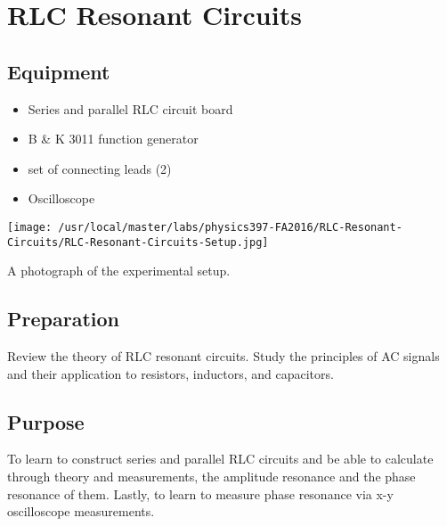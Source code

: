 

%
%


\setcounter{chapter}{5}
\setcounter{equation}{0}
\setcounter{table}{0}
\setcounter{figure}{0}
\chapter{RLC Resonant Circuits}

\section{Equipment}

\begin{minipage}[t]{0.6\textwidth}
\begin{itemize}[noitemsep]
\item Series and parallel RLC circuit board
\item B \& K 3011 function generator
\item set of connecting leads (2)
\end{itemize}
\end{minipage}
\begin{minipage}[t]{0.35\textwidth}
\begin{itemize}[noitemsep]
\item Oscilloscope
\end{itemize}
\end{minipage}

\begin{marginfigure}[+1in]
\texttt{[image: /usr/local/master/labs/physics397-FA2016/RLC-Resonant-Circuits/RLC-Resonant-Circuits-Setup.jpg]}
\caption{A photograph of the experimental setup.}
\label{fig:RLsetup}
\end{marginfigure}

\section{Preparation}
Review the theory of RLC resonant circuits. Study the principles of AC signals and their application to resistors, inductors, and capacitors. 

\section{Purpose}
To learn to construct series and parallel RLC circuits and be able to calculate through theory and measurements, the amplitude resonance and the phase resonance of them. Lastly, to learn to measure phase resonance via x-y oscilloscope measurements.

